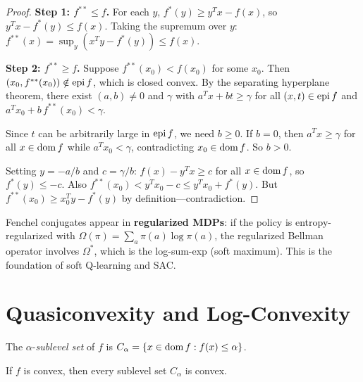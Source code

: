 \documentclass[11pt,a4paper]{article}
\begin{document}
\begin{proof}
\textbf{Step 1: $f^{**} \le f$.}  For each $y$,
$f^*(y) \ge y^T x - f(x)$, so $y^T x - f^*(y) \le f(x)$.  Taking the
supremum over $y$: $f^{**}(x) = \sup_y(x^T y - f^*(y)) \le f(x)$.

\textbf{Step 2: $f^{**} \ge f$.}  Suppose $f^{**}(x_0) < f(x_0)$ for some
$x_0$.  Then $(x_0, f^{**}(x_0)) \notin \operatorname{epi} f$, which is closed convex.
By the separating hyperplane theorem, there exist $(a, b) \ne 0$ and
$\gamma$ with
$a^T x + bt \ge \gamma$ for all $(x,t) \in \operatorname{epi} f$ and
$a^T x_0 + b\, f^{**}(x_0) < \gamma$.

Since $t$ can be arbitrarily large in $\operatorname{epi} f$, we need $b \ge 0$.  If
$b = 0$, then $a^T x \ge \gamma$ for all $x \in \operatorname{dom} f$ while
$a^T x_0 < \gamma$, contradicting $x_0 \in \operatorname{dom} f$.  So $b > 0$.

Setting $y = -a/b$ and $c = \gamma/b$: $f(x) - y^T x \ge c$ for all
$x \in \operatorname{dom} f$, so $f^*(y) \le -c$.  Also
$f^{**}(x_0) < y^T x_0 - c \le y^T x_0 + f^*(y)$.  But
$f^{**}(x_0) \ge x_0^T y - f^*(y)$ by definition---contradiction.
\end{proof}

\begin{rlconnection}
Fenchel conjugates appear in \textbf{regularized MDPs}: if the policy is
entropy-regularized with $\Omega(\pi) = \sum_a \pi(a)\log\pi(a)$, the
regularized Bellman operator involves $\Omega^*$, which is the log-sum-exp
(soft maximum).  This is the foundation of soft Q-learning and SAC.
\end{rlconnection}


\section{Quasiconvexity and Log-Convexity}

\begin{definition}
\label{def:sublevel}
The $\alpha$-\emph{sublevel set} of $f$ is
$C_\alpha = \{x \in \operatorname{dom} f : f(x) \le \alpha\}$.
\end{definition}

\begin{proposition}
\label{prop:sublevel}
If $f$ is convex, then every sublevel set $C_\alpha$ is convex.
\end{proposition}
\end{document}

